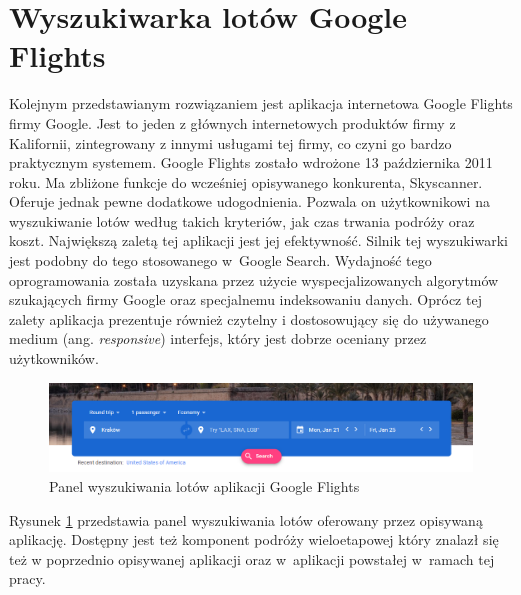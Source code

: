 \documentclass[12pt, twoside]{report}
\begin{document}
\section{Wyszukiwarka lotów Google Flights}
Kolejnym przedstawianym rozwiązaniem jest aplikacja internetowa Google Flights firmy Google. Jest to jeden z głównych internetowych produktów firmy z Kalifornii, zintegrowany z innymi usługami tej firmy, co czyni go bardzo praktycznym systemem. Google Flights zostało wdrożone 13 października 2011 roku\cite{googleFlights}. Ma zbliżone funkcje do wcześniej opisywanego konkurenta, Skyscanner. Oferuje jednak pewne dodatkowe udogodnienia. Pozwala on użytkownikowi na wyszukiwanie lotów według takich kryteriów, jak czas trwania podróży oraz koszt. Największą zaletą tej aplikacji jest jej efektywność. Silnik tej wyszukiwarki jest podobny do tego stosowanego w~Google Search. Wydajność tego oprogramowania została uzyskana przez użycie wyspecjalizowanych algorytmów szukających firmy Google oraz specjalnemu indeksowaniu danych. Oprócz tej zalety aplikacja prezentuje również czytelny i dostosowujący się do używanego medium (ang. \emph{responsive}) interfejs, który jest dobrze oceniany przez użytkowników.

\begin{figure}[!ht]
\centering
\includegraphics[scale=0.50, keepaspectratio]{google_flights_search_panel.png}
\caption{Panel wyszukiwania lotów aplikacji Google Flights}
\label{fig:google_flights_search_panel}
\end{figure}
Rysunek \ref{fig:google_flights_search_panel} przedstawia panel wyszukiwania lotów oferowany przez opisywaną aplikację. Dostępny jest też komponent podróży wieloetapowej który znalazł się też w poprzednio opisywanej aplikacji oraz w~aplikacji powstałej w~ramach tej pracy.
\end{document}

